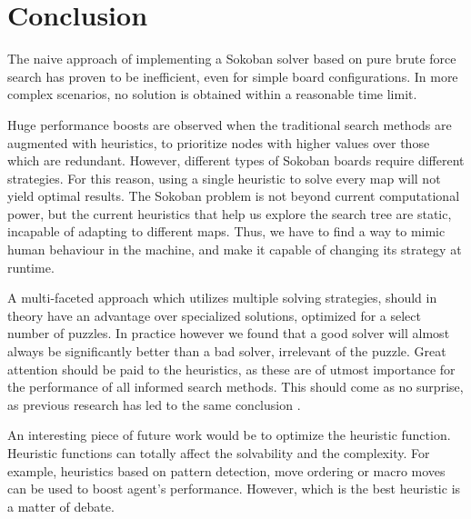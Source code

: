 \section{Conclusion}\label{sec:conclusion}

The naive approach of implementing a Sokoban solver based on pure brute force search has proven to be inefficient, even for simple board configurations. In more complex scenarios, no solution is obtained within a reasonable time limit. 

Huge performance boosts are observed when the traditional search methods are augmented with heuristics, to prioritize nodes with higher values over those which are redundant. However, different types of Sokoban boards require different strategies. For this reason, using a single heuristic to solve every map will not yield optimal results. The Sokoban problem is not beyond current computational power, but the current heuristics that help us explore the search tree are static, incapable of adapting to different maps. Thus, we have to find a way to mimic human behaviour in the machine, and make it capable of changing its strategy at runtime. 

A multi-faceted approach which utilizes multiple solving strategies, should in theory have an advantage over specialized solutions, optimized for a select number of puzzles. In practice however we found that a good solver will almost always be significantly better than a bad solver, irrelevant of the puzzle. Great attention should be paid to the heuristics, as these are of utmost importance for the performance of all informed search methods. This should come as no surprise, as previous research has led to the same conclusion \cite{junghanns2001sokoban}.

An interesting piece of future work would be to optimize the heuristic function. Heuristic functions can totally affect the solvability and the complexity. For example, heuristics based on pattern detection, move ordering or macro moves can be used to boost agent's performance. However, which is the best heuristic is a matter of debate. 
